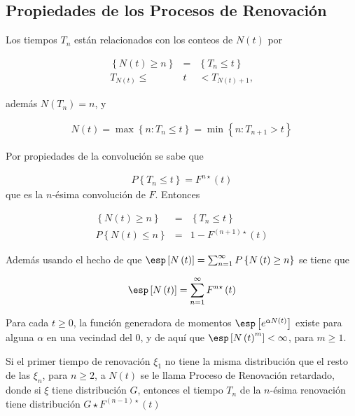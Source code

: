 \subsection{Propiedades de los Procesos de Renovaci\'on}
%

Los tiempos $T_{n}$ est\'an relacionados con los conteos de $N\left(t\right)$ por

\begin{eqnarray*}
\left\{N\left(t\right)\geq n\right\}&=&\left\{T_{n}\leq t\right\}\\
T_{N\left(t\right)}\leq &t&<T_{N\left(t\right)+1},
\end{eqnarray*}

adem\'as $N\left(T_{n}\right)=n$, y 

\begin{eqnarray*}
N\left(t\right)=\max\left\{n:T_{n}\leq t\right\}=\min\left\{n:T_{n+1}>t\right\}
\end{eqnarray*}

Por propiedades de la convoluci\'on se sabe que

\begin{eqnarray*}
P\left\{T_{n}\leq t\right\}=F^{n\star}\left(t\right)
\end{eqnarray*}
que es la $n$-\'esima convoluci\'on de $F$. Entonces 

\begin{eqnarray*}
\left\{N\left(t\right)\geq n\right\}&=&\left\{T_{n}\leq t\right\}\\
P\left\{N\left(t\right)\leq n\right\}&=&1-F^{\left(n+1\right)\star}\left(t\right)
\end{eqnarray*}

Adem\'as usando el hecho de que $\esp\left[N\left(t\right)\right]=\sum_{n=1}^{\infty}P\left\{N\left(t\right)\geq n\right\}$
se tiene que

\begin{eqnarray*}
\esp\left[N\left(t\right)\right]=\sum_{n=1}^{\infty}F^{n\star}\left(t\right)
\end{eqnarray*}

\begin{Prop}
Para cada $t\geq0$, la funci\'on generadora de momentos $\esp\left[e^{\alpha N\left(t\right)}\right]$ existe para alguna $\alpha$ en una vecindad del 0, y de aqu\'i que $\esp\left[N\left(t\right)^{m}\right]<\infty$, para $m\geq1$.
\end{Prop}


\begin{Note}
Si el primer tiempo de renovaci\'on $\xi_{1}$ no tiene la misma distribuci\'on que el resto de las $\xi_{n}$, para $n\geq2$, a $N\left(t\right)$ se le llama Proceso de Renovaci\'on retardado, donde si $\xi$ tiene distribuci\'on $G$, entonces el tiempo $T_{n}$ de la $n$-\'esima renovaci\'on tiene distribuci\'on $G\star F^{\left(n-1\right)\star}\left(t\right)$
\end{Note}


